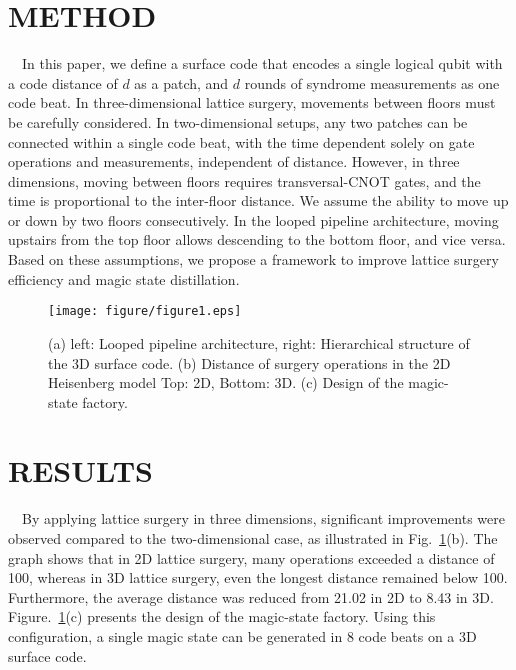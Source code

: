   \section{METHOD}
  \vspace{-8pt}
  \ \ In this paper, we define a surface code that encodes a single logical qubit with a code distance of $d$ as a patch, and $d$ rounds of syndrome measurements as one code beat. In three-dimensional lattice surgery, movements between floors must be carefully considered. In two-dimensional setups, any two patches can be connected within a single code beat, with the time dependent solely on gate operations and measurements, independent of distance. However, in three dimensions, moving between floors requires transversal-CNOT gates, and the time is proportional to the inter-floor distance. We assume the ability to move up or down by two floors consecutively. In the looped pipeline architecture, moving upstairs from the top floor allows descending to the bottom floor, and vice versa. Based on these assumptions, we propose a framework to improve lattice surgery efficiency and magic state distillation.
  \begin{figure}[t]
    \centering
    \texttt{[image: figure/figure1.eps]}
    \vspace{-10pt}\caption{(a) left: Looped pipeline architecture, right:  Hierarchical structure of the 3D surface code. (b) Distance of surgery operations in the 2D Heisenberg model Top: 2D, Bottom: 3D. (c) Design of the magic-state factory.}
    \label{figure1}
    \vspace{-15pt}
  \end{figure}
  \section{RESULTS}
  \vspace{-8pt}
  \ \ By applying lattice surgery in three dimensions, significant improvements were observed compared to the two-dimensional case, as illustrated in Fig.\ \ref{figure1}(b). The graph shows that in 2D lattice surgery, many operations exceeded a distance of 100, whereas in 3D lattice surgery, even the longest distance remained below 100. Furthermore, the average distance was reduced from 21.02 in 2D to 8.43 in 3D. Figure.\ \ref{figure1}(c) presents the design of the magic-state factory. Using this configuration, a single magic state can be generated in 8 code beats on a 3D surface code.
